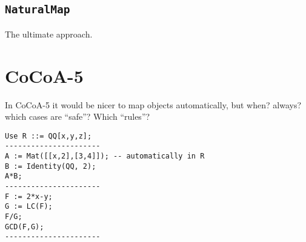 \documentclass{article}[12,a4paper]
\begin{document}
\subsection{\texttt{NaturalMap}}

The ultimate approach.

\section{CoCoA-5}

In CoCoA-5 it would be nicer to map objects automatically, but when?
always? which cases are ``safe''?  Which ``rules''?

\begin{verbatim}
Use R ::= QQ[x,y,z];
----------------------
A := Mat([[x,2],[3,4]]); -- automatically in R
B := Identity(QQ, 2);
A*B;
----------------------
F := 2*x-y;
G := LC(F);
F/G;
GCD(F,G);
----------------------
\end{verbatim}


\end{document}
